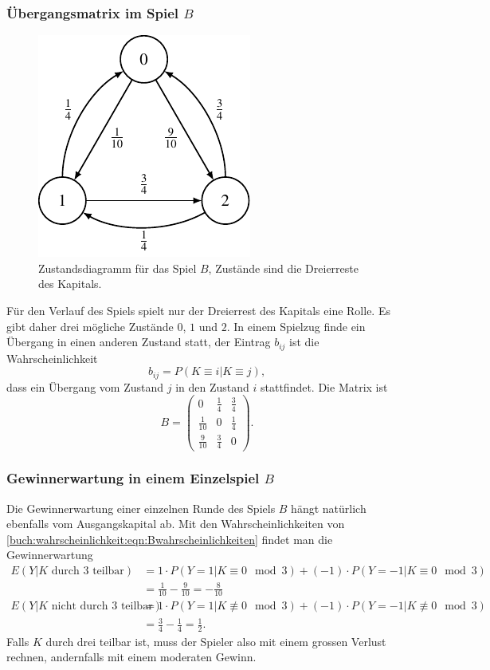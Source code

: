\subsubsection{Übergangsmatrix im Spiel $B$}
\begin{figure}
\centering
\includegraphics{chapters/80-wahrscheinlichkeit/images/spielB.pdf}
\caption{Zustandsdiagramm für das Spiel $B$, Zustände sind die
Dreierreste des Kapitals.
\label{buch:wahrscheinlichkeit:fig:spielB}}
\end{figure}%
Für den Verlauf des Spiels spielt nur der Dreierrest des Kapitals
eine Rolle.
Es gibt daher drei mögliche Zustände $0$, $1$ und $2$.
In einem Spielzug finde ein Übergang in einen anderen Zustand
statt, der Eintrag $b_{ij}$ ist die Wahrscheinlichkeit
\[
b_{ij}
=
P(K\equiv i|K\equiv j),
\]
dass ein Übergang vom Zustand $j$ in den Zustand $i$ stattfindet.
Die Matrix ist
\[
B=
\begin{pmatrix}
0          &\frac14 &\frac34\\
\frac1{10} &0       &\frac14\\
\frac9{10} &\frac34 &0
\end{pmatrix}.
\]

\subsubsection{Gewinnerwartung in einem Einzelspiel $B$}
Die Gewinnerwartung einer einzelnen Runde des Spiels $B$ hängt natürlich
ebenfalls vom Ausgangskapital ab.
Mit den Wahrscheinlichkeiten von 
\eqref{buch:wahrscheinlichkeit:eqn:Bwahrscheinlichkeiten}
findet man die Gewinnerwartung
\begin{equation}
\begin{aligned}
E(Y| \text{$K$ durch $3$ teilbar})
&=
1\cdot P(Y=1|K\equiv 0\mod 3)
+
(-1)\cdot P(Y=-1|K\equiv 0\mod 3)
\\
&=
\frac1{10}
-
\frac{9}{10}
=
-\frac{8}{10}
\\
E(Y| \text{$K$ nicht durch $3$ teilbar})
&=
1\cdot P(Y=1|K\not\equiv 0\mod 3)
+
(-1)\cdot P(Y=-1|K\not\equiv 0\mod 3)
\\
&=
\frac34-\frac14
=
\frac12.
\end{aligned}
\label{buch:wahrscheinlichkeit:eqn:Berwartungen}
\end{equation}
Falls $K$ durch drei teilbar ist, muss der Spieler
also mit einem grossen Verlust rechnen, andernfalls mit einem
moderaten Gewinn.

